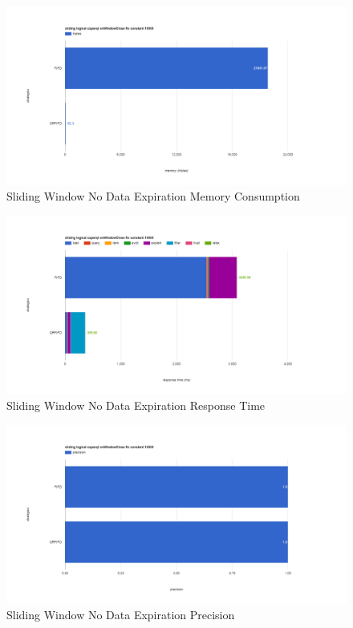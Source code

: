 \begin{figure}[!htbp]
	\centering
    \includegraphics[width=6.5in]{img/app3-slide-no-m.png}
    \caption{Sliding Window No Data Expiration Memory Consumption}
\end{figure}
\begin{figure}[!htbp]
	\centering
    \includegraphics[width=6.5in]{img/app3-slide-no-r.png}
    \caption{Sliding Window No Data Expiration Response Time}
\end{figure}
\begin{figure}[!htbp]
	\centering
    \includegraphics[width=6.5in]{img/app3-slide-no-p.png}
    \caption{Sliding Window No Data Expiration Precision}
\end{figure}
